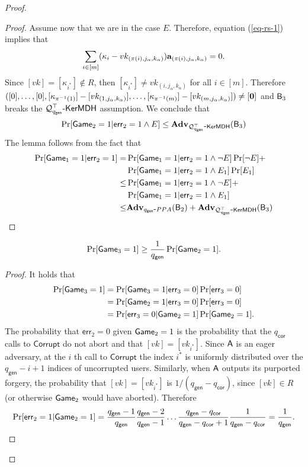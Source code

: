 \begin{proof}
\begin{proof}
Assume now that we are in the case $E$. Therefore, equation (\ref{eq-rs-1}) implies that
\begin{align*}
\sum_{i\in[m]}(\kappa_i-vk_{(\pi(i),j_\alpha,k_\alpha)})\mathbf{a}_{(\pi(i),j_\alpha,k_\alpha)}=0.
\end{align*}
Since $[vk]=[\kappa_{i^*}]\notin R$, then $[\kappa_{i^*}]\neq vk_{(i,j_\alpha,k_\alpha)}$ for all $i\in[m]$. Therefore $([0],\ldots,[0],[\kappa_{\pi^{-1}(1)}]-[vk_{(1,j_\alpha,k_\alpha)}],\ldots,[\kappa_{\pi^{-1}(m)}]-[vk_{(m,j_\alpha,k_\alpha)}])\neq [\mathbf{0}]$ and $\mathsf{B}_3$ breaks the $\mathcal{Q}_{q_\mathsf{gen}}^\top\mbox{-}\mathsf{KerMDH}$ assumption. We conclude that
$$\Pr[\mathsf{Game}_2=1|\mathsf{err}_2=1\wedge E]\leq\mathbf{Adv}_{\mathcal{Q}^\top_{q_\mathsf{gen}}\mbox{-}\mathsf{KerMDH}}(\mathsf{B}_3)$$
The lemma follows from the fact that
\begin{align*}
\Pr[\mathsf{Game}_1=1|\mathsf{err}_2=1]=&\Pr[\mathsf{Game}_1=1|\mathsf{err}_2=1\wedge\neg E]\Pr[\neg E]+\\
&\Pr[\mathsf{Game}_1=1|\mathsf{err}_2=1\wedge{E}_1]\Pr[{E}_1]\\
\leq & \Pr[\mathsf{Game}_1=1|\mathsf{err}_2=1\wedge\neg E]+\\
&\Pr[\mathsf{Game}_1=1|\mathsf{err}_2=1\wedge{E}_1]\\
\leq & \mathbf{Adv}_{{q_\mathsf{gen}}\mbox{-}PPA}(\mathsf{B}_2)+\mathbf{Adv}_{\mathcal{Q}^\top_{q_\mathsf{gen}}\mbox{-}\mathsf{KerMDH}}(\mathsf{B}_3)
\end{align*}
\end{proof}

\begin{lemma}
$$
\Pr[\mathsf{Game}_3=1]\geq \frac{1}{{q_\mathsf{gen}}}\Pr[\mathsf{Game}_2=1].
$$
\end{lemma}
\begin{proof}
It holds that
\begin{align*}
\Pr[\mathsf{Game}_3=1] &= \Pr[\mathsf{Game}_3=1|\mathsf{err}_3=0]\Pr[\mathsf{err}_3=0]\\
&=\Pr[\mathsf{Game}_2=1|\mathsf{err}_3=0]\Pr[\mathsf{err}_3=0]\\
&=\Pr[\mathsf{err}_3=0|\mathsf{Game}_2=1]\Pr[\mathsf{Game}_2=1].
\end{align*}
The probability that $\mathsf{err}_2=0$ given $\mathsf{Game}_2=1$ is the probability that the ${q_\mathsf{cor}}$ calls to $\mathsf{Corrupt}$ do not abort and that $[vk]=[vk_{i^*}]$. Since $\mathsf{A}$ is an eager adversary, at the $i$ th call to $\mathsf{Corrupt}$ the index $i^*$ is uniformly distributed over the ${q_\mathsf{gen}}-i+1$ indices of uncorrupted users. Similarly, when $\mathsf{A}$ outputs its purported forgery, the probability that $[vk]=[vk_{i^*}]$ is $1/({q_\mathsf{gen}}-{q_\mathsf{cor}})$, since $[vk]\in R$ (or otherwise $\mathsf{Game}_2$ would have aborted). Therefore
$$
\Pr[\mathsf{err}_2=1|\mathsf{Game}_2=1]=\frac{{q_\mathsf{gen}}-1}{{q_\mathsf{gen}}}\frac{{q_\mathsf{gen}}-2}{{q_\mathsf{gen}}-1}\ldots\frac{{q_\mathsf{gen}}-{q_\mathsf{cor}}}{{q_\mathsf{gen}}-{q_\mathsf{cor}}+1}\frac{1}{{q_\mathsf{gen}}-{q_\mathsf{cor}}}=\frac{1}{{q_\mathsf{gen}}}.
$$ 
\end{proof}


\end{proof}
